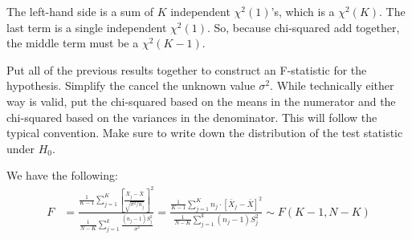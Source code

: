 
The left-hand side is a sum of $K$ independent $\chi^2(1)$'s, which is a
$\chi^2(K)$. The last term is a single independent $\chi^2(1)$. So, because
chi-squared add together, the middle term must be a $\chi^2(K - 1)$.


Put all of the previous results together to construct an F-statistic for the
hypothesis. Simplify the cancel the unknown value $\sigma^2$. While technically
either way is valid, put the chi-squared based on the means in the numerator and
the chi-squared based on the variances in the denominator. This will follow the
typical convention. Make sure to write down the distribution of the test statistic
under $H_0$.


We have the following:
\begin{align*}
F &= \frac{
  \frac{1}{K-1} \sum_{j=1}^K \left[\frac{\bar{X}_j - \bar{X}}{\sqrt{\sigma^2 / n_j}}\right]^2
}{
  \frac{1}{N-K} \sum_{j=1}^k \frac{(n_j - 1) S_j^2}{\sigma^2}
} = \frac{
  \frac{1}{K-1} \sum_{j=1}^K n_j \cdot \left[\bar{X}_j - \bar{X}\right]^2
}{
  \frac{1}{N-K} \sum_{j=1}^k (n_j - 1) S_j^2
} \sim F(K-1, N-K)
\end{align*}

